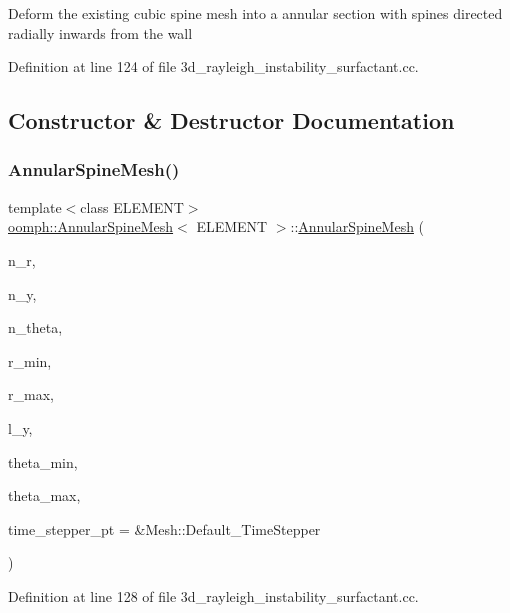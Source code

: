 Deform the existing cubic spine mesh into a annular section with spines directed radially inwards from the wall 

Definition at line 124 of file 3d\+\_\+rayleigh\+\_\+instability\+\_\+surfactant.\+cc.



\subsection{Constructor \& Destructor Documentation}
\mbox{\label{classoomph_1_1AnnularSpineMesh_af34e5562ca72806c2ec0b285495b75bc}} 
\subsubsection{\texorpdfstring{Annular\+Spine\+Mesh()}{AnnularSpineMesh()}}
{\footnotesize\ttfamily template$<$class E\+L\+E\+M\+E\+NT$>$ \\
\hyperlink{classoomph_1_1AnnularSpineMesh}{oomph\+::\+Annular\+Spine\+Mesh}$<$ E\+L\+E\+M\+E\+NT $>$\+::\hyperlink{classoomph_1_1AnnularSpineMesh}{Annular\+Spine\+Mesh} (\begin{DoxyParamCaption}\item[{const unsigned \&}]{n\+\_\+r,  }\item[{const unsigned \&}]{n\+\_\+y,  }\item[{const unsigned \&}]{n\+\_\+theta,  }\item[{const double \&}]{r\+\_\+min,  }\item[{const double \&}]{r\+\_\+max,  }\item[{const double \&}]{l\+\_\+y,  }\item[{const double \&}]{theta\+\_\+min,  }\item[{const double \&}]{theta\+\_\+max,  }\item[{Time\+Stepper $\ast$}]{time\+\_\+stepper\+\_\+pt = {\ttfamily \&Mesh\+:\+:Default\+\_\+TimeStepper} }\end{DoxyParamCaption})\hspace{0.3cm}{\ttfamily [inline]}}



Definition at line 128 of file 3d\+\_\+rayleigh\+\_\+instability\+\_\+surfactant.\+cc.



